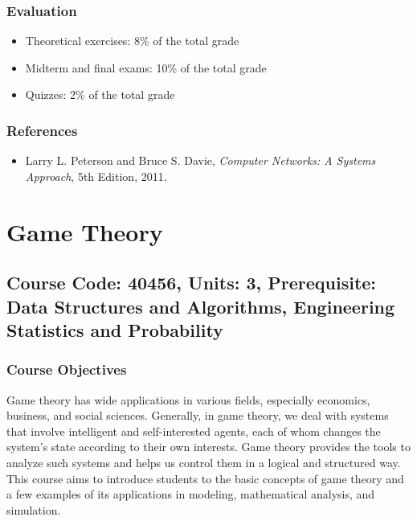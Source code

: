 \documentclass[12pt]{article}
\begin{document}
\subsubsection*{Evaluation}
\begin{itemize}
    \item Theoretical exercises: 8\% of the total grade
    \item Midterm and final exams: 10\% of the total grade
    \item Quizzes: 2\% of the total grade
\end{itemize}

\subsubsection*{References}
\begin{itemize}
    \item Larry L. Peterson and Bruce S. Davie, \textit{Computer Networks: A Systems Approach}, 5th Edition, 2011.
\end{itemize}

\newpage

\section{Game Theory}
\subsection*{Course Code: 40456, Units: 3, Prerequisite: Data Structures and Algorithms, Engineering Statistics and Probability}

\subsubsection*{Course Objectives}
Game theory has wide applications in various fields, especially economics, business, and social sciences. Generally, in game theory, we deal with systems that involve intelligent and self-interested agents, each of whom changes the system's state according to their own interests. Game theory provides the tools to analyze such systems and helps us control them in a logical and structured way. This course aims to introduce students to the basic concepts of game theory and a few examples of its applications in modeling, mathematical analysis, and simulation.
\end{document}
